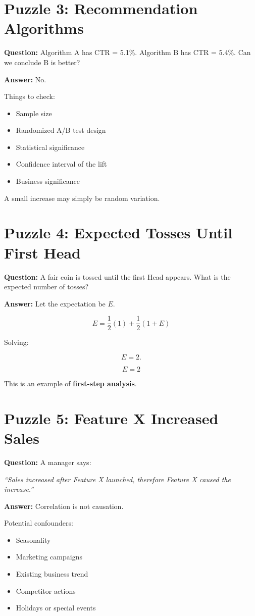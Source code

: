 \documentclass{article}
\begin{document}
\section*{Puzzle 3: Recommendation Algorithms}

\textbf{Question:}
Algorithm A has CTR = 5.1\%. Algorithm B has CTR = 5.4\%.
Can we conclude B is better?

\textbf{Answer:}
No.

Things to check:
\begin{itemize}
    \item Sample size
    \item Randomized A/B test design
    \item Statistical significance
    \item Confidence interval of the lift
    \item Business significance
\end{itemize}

A small increase may simply be random variation.

\section*{Puzzle 4: Expected Tosses Until First Head}

\textbf{Question:}
A fair coin is tossed until the first Head appears.
What is the expected number of tosses?

\textbf{Answer:}
Let the expectation be $E$.

\[
E=\frac12(1)+\frac12(1+E)
\]

Solving:

\[
E=2.
\]

\[
\boxed{E=2}
\]

This is an example of \textbf{first-step analysis}.

\section*{Puzzle 5: Feature X Increased Sales}

\textbf{Question:}
A manager says:

\textit{``Sales increased after Feature X launched, therefore Feature X caused the increase.''}

\textbf{Answer:}
Correlation is not causation.

Potential confounders:
\begin{itemize}
    \item Seasonality
    \item Marketing campaigns
    \item Existing business trend
    \item Competitor actions
    \item Holidays or special events
\end{itemize}
\end{document}
